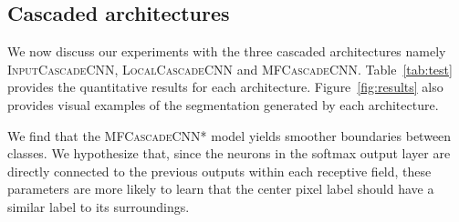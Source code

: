 \documentclass[final,5p,times,twocolumn]{elsarticle}
\begin{document}
{\begin{table*}[tp]
\begin{center}
\label{tab:basicmodel}
\end{center}
\end{table*}


\subsection{Cascaded architectures}



We now discuss our experiments with the three cascaded architectures namely \textsc{InputCascadeCNN}, \textsc{LocalCascadeCNN} and \textsc{MFCascadeCNN}.  Table~\ref{tab:test} provides the quantitative results for each architecture. Figure~\ref{fig:results} also provides visual examples of the segmentation generated by each architecture.
\begin{table*}[t!]

\caption{Performance of the cascaded architectures. The reported results are from the second phase training. The `Rank' column shows the ranking of each method in the online score board at the time of submission.}

\begin{center}

\end{center}

\vspace*{-0.25cm}
\label{tab:test}
\end{table*}

We find that the \textsc{MFCascadeCNN*} model yields smoother boundaries between classes. We hypothesize that, since the neurons in the softmax output layer are directly connected to the previous outputs within each receptive field, these parameters are more likely to learn that the center pixel label should have a similar label to its surroundings. 

}
\end{document}
